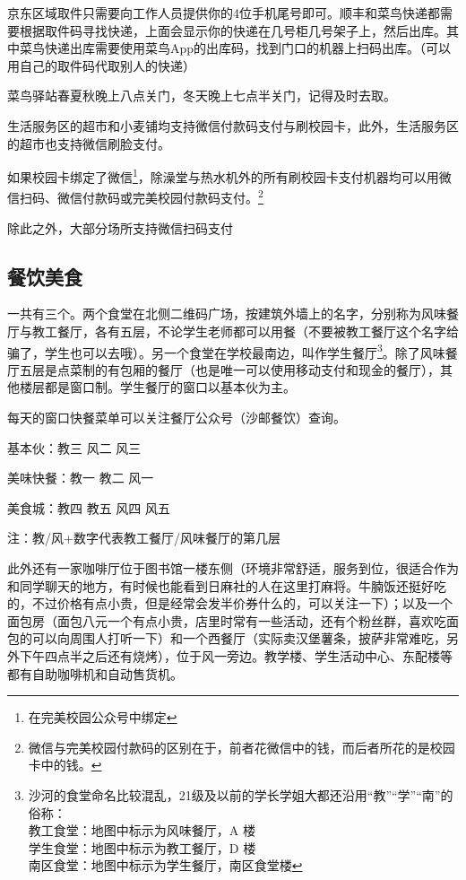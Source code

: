 京东区域取件只需要向工作人员提供你的4位手机尾号即可。顺丰和菜鸟快递都需要根据取件码寻找快递，上面会显示你的快递在几号柜几号架子上，然后出库。其中菜鸟快递出库需要使用菜鸟App的出库码，找到门口的机器上扫码出库。（可以用自己的取件码代取别人的快递）

菜鸟驿站春夏秋晚上八点关门，冬天晚上七点半关门，记得及时去取。



生活服务区的超市和小麦铺均支持微信付款码支付与刷校园卡，此外，生活服务区的超市也支持微信刷脸支付。

如果校园卡绑定了微信\footnote{在完美校园公众号中绑定}，除澡堂与热水机外的所有刷校园卡支付机器均可以用微信扫码、微信付款码或完美校园付款码支付。\footnote{微信与完美校园付款码的区别在于，前者花微信中的钱，而后者所花的是校园卡中的钱。}

除此之外，大部分场所支持微信扫码支付


\subsection{餐饮美食}


一共有三个。两个食堂在北侧二维码广场，按建筑外墙上的名字，分别称为风味餐厅与教工餐厅，各有五层，不论学生老师都可以用餐（不要被教工餐厅这个名字给骗了，学生也可以去哦）。另一个食堂在学校最南边，叫作学生餐厅\footnote{沙河的食堂命名比较混乱，21级及以前的学长学姐大都还沿用“教”“学”“南”的俗称：\\\hspace*{4em}教工食堂：地图中标示为风味餐厅，A 楼\\\hspace*{4em}学生食堂：地图中标示为教工餐厅，D 楼\\\hspace*{4em}南区食堂：地图中标示为学生餐厅，南区食堂楼}。除了风味餐厅五层是点菜制的有包厢的餐厅（也是唯一可以使用移动支付和现金的餐厅），其他楼层都是窗口制。学生餐厅的窗口以基本伙为主。

每天的窗口快餐菜单可以关注餐厅公众号（沙邮餐饮）查询。

基本伙：教三 风二 风三

美味快餐：教一 教二 风一

美食城：教四 教五 风四 风五

注：教/风+数字代表教工餐厅/风味餐厅的第几层

此外还有一家咖啡厅位于图书馆一楼东侧（环境非常舒适，服务到位，很适合作为和同学聊天的地方，有时候也能看到日麻社的人在这里打麻将。牛腩饭还挺好吃的，不过价格有点小贵，但是经常会发半价券什么的，可以关注一下）；以及一个面包房（面包八元一个有点小贵，店里时常有一些活动，还有个粉丝群，喜欢吃面包的可以向周围人打听一下）和一个西餐厅（实际卖汉堡薯条，披萨非常难吃，另外下午四点半之后还有烧烤），位于风一旁边。教学楼、学生活动中心、东配楼等都有自助咖啡机和自动售货机。

